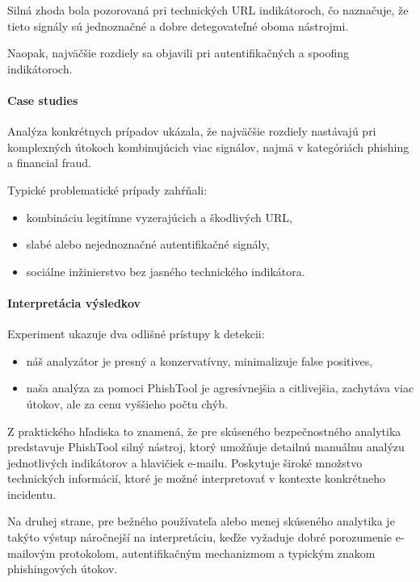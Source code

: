 \documentclass[conference]{IEEEtran}
\begin{document}
Silná zhoda bola pozorovaná pri technických URL indikátoroch,
čo naznačuje, že tieto signály sú jednoznačné a dobre detegovateľné
oboma nástrojmi.

Naopak, najväčšie rozdiely sa objavili pri autentifikačných a spoofing indikátoroch.

\paragraph{Case studies}

Analýza konkrétnych prípadov ukázala, že najväčšie rozdiely
nastávajú pri komplexných útokoch kombinujúcich viac signálov,
najmä v kategóriách phishing a financial fraud.

Typické problematické prípady zahŕňali:

\begin{itemize}
    \item kombináciu legitímne vyzerajúcich a škodlivých URL,
    \item slabé alebo nejednoznačné autentifikačné signály,
    \item sociálne inžinierstvo bez jasného technického indikátora.
\end{itemize}

\paragraph{Interpretácia výsledkov}

Experiment ukazuje dva odlišné prístupy k detekcii:

\begin{itemize}
    \item náš analyzátor je presný a konzervatívny,
    minimalizuje false positives,
    \item naša analýza za pomoci PhishTool je agresívnejšia a citlivejšia,
    zachytáva viac útokov, ale za cenu vyššieho počtu chýb.
\end{itemize}

Z praktického hľadiska to znamená, že pre skúseného bezpečnostného
analytika predstavuje PhishTool silný nástroj, ktorý umožňuje detailnú
manuálnu analýzu jednotlivých indikátorov a hlavičiek e-mailu.
Poskytuje široké množstvo technických informácií, ktoré je možné
interpretovať v kontexte konkrétneho incidentu.

Na druhej strane, pre bežného používateľa alebo menej skúseného analytika
je takýto výstup náročnejší na interpretáciu, keďže vyžaduje dobré
porozumenie e-mailovým protokolom, autentifikačným mechanizmom
a typickým znakom phishingových útokov.
\end{document}
